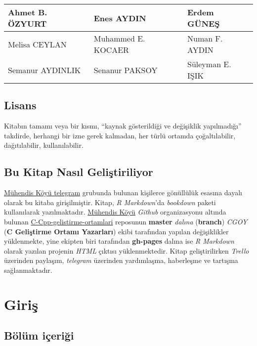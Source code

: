 \documentclass[
]{book}
\begin{document}
\begin{tabular}{l|l|l}
\hline
Ahmet B. ÖZYURT & Enes AYDIN & Erdem GÜNEŞ\\
\hline
Melisa CEYLAN & Muhammed E. KOCAER & Numan F. AYDIN\\
\hline
Semanur AYDINLIK & Senanur PAKSOY & Süleyman E. IŞIK\\
\hline
\end{tabular}

\hypertarget{lisans}{%
\section*{Lisans}\label{lisans}}

Kitabın tamamı veya bir kısmı, ``kaynak gösterildiği ve değişiklik yapılmadığı'' takdirde, herhangi bir izne gerek kalmadan, her türlü ortamda çoğaltılabilir, dağıtılabilir, kullanılabilir.

\hypertarget{bu-kitap-nasux131l-geliux15ftiriliyor}{%
\section*{Bu Kitap Nasıl Geliştiriliyor}\label{bu-kitap-nasux131l-geliux15ftiriliyor}}

\href{https://t.me/koyumuhendis}{Mühendis Köyü telegram} grubunda bulunan kişilerce gönüllülük esasına dayalı olarak bu kitaba girişilmiştir. Kitap, \emph{R Markdown}'da \emph{bookdown} paketi kullanılarak yazılmaktadır. \href{https://github.com/MuhendisKoyu}{Mühendis Köyü} \emph{Github} organizasyonu altında bulunan \href{https://github.com/MuhendisKoyu/C-Cpp-gelistirme-ortamlari}{C-Cpp-gelistirme-ortamlari} reposunun \textbf{master} \emph{dalına} (\textbf{branch}) \emph{CGOY} (\textbf{C Geliştirme Ortamı Yazarları}) ekibi tarafından yapılan değişiklikler yüklenmekte, yine ekipten biri tarafından \textbf{gh-pages} dalına ise \emph{R Markdown} olarak yazılan projenin \emph{HTML} çıktısı yüklenmektedir. Kitap geliştirilirken \emph{Trello} üzerinden paylaşım, \emph{telegram} üzerinden yardımlaşma, haberleşme ve tartışma sağlanmaktadır.

\hypertarget{giriux15f}{%
\chapter*{Giriş}\label{giriux15f}}

\hypertarget{buxf6luxfcm-iuxe7eriux11fi}{%
\section*{Bölüm içeriği}\label{buxf6luxfcm-iuxe7eriux11fi}}
\end{document}
